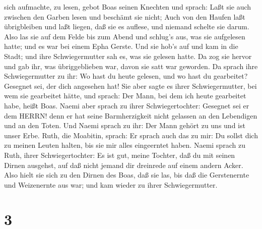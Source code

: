 sich aufmachte, zu lesen, gebot Boas seinen Knechten und sprach: Laßt
sie auch zwischen den Garben lesen und beschämt sie nicht; 
Auch von den Haufen laßt übrigbleiben und laßt liegen, daß sie es
auflese, und niemand schelte sie darum.  Also las sie auf
dem Felde bis zum Abend und schlug's aus, was sie aufgelesen hatte; und
es war bei einem Epha Gerste.  Und sie hob's auf und kam in
die Stadt; und ihre Schwiegermutter sah es, was sie gelesen hatte. Da
zog sie hervor und gab ihr, was übriggeblieben war, davon sie satt war
geworden.  Da sprach ihre Schwiegermutter zu ihr: Wo hast
du heute gelesen, und wo hast du gearbeitet? Gesegnet sei, der dich
angesehen hat! Sie aber sagte es ihrer Schwiegermutter, bei wem sie
gearbeitet hätte, und sprach: Der Mann, bei dem ich heute gearbeitet
habe, heißt Boas.  Naemi aber sprach zu ihrer
Schwiegertochter: Gesegnet sei er dem HERRN! denn er hat seine
Barmherzigkeit nicht gelassen an den Lebendigen und an den Toten. Und
Naemi sprach zu ihr: Der Mann gehört zu uns und ist unser Erbe.
 Ruth, die Moabitin, sprach: Er sprach auch das zu mir: Du
sollst dich zu meinen Leuten halten, bis sie mir alles eingeerntet
haben.  Naemi sprach zu Ruth, ihrer Schwiegertochter: Es
ist gut, meine Tochter, daß du mit seinen Dirnen ausgehst, auf daß nicht
jemand dir dreinrede auf einem andern Acker.  Also hielt
sie sich zu den Dirnen des Boas, daß sie las, bis daß die Gerstenernte
und Weizenernte aus war; und kam wieder zu ihrer Schwiegermutter.

\hypertarget{section-2}{%
\section{3}\label{section-2}}

